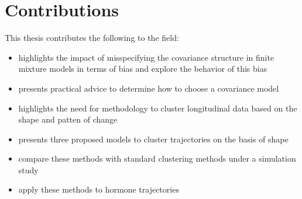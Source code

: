 \section{Contributions}
This thesis contributes the following to the field:
\begin{itemize}
\item highlights the impact of misspecifying the covariance structure in finite mixture models in terms of bias and explore the behavior of this bias
\item presents practical advice to determine how to choose a covariance model
\item highlights the need for methodology to cluster longitudinal data based on the shape and patten of change
\item presents three proposed models to cluster trajectories on the basis of shape
\item compare these methods with standard clustering methods under a simulation study
\item apply these methods to hormone trajectories
\end{itemize}
